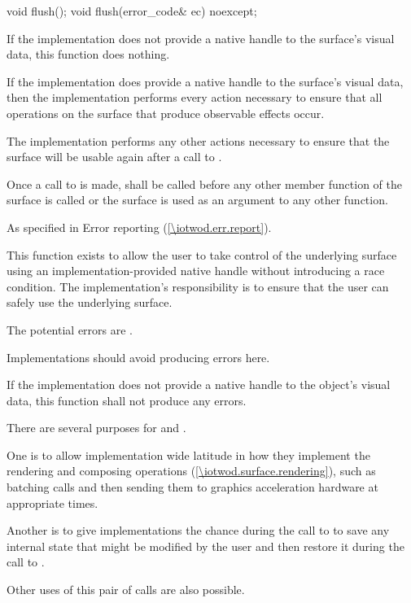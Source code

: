 %
\begin{itemdecl}
void flush();
void flush(error_code& ec) noexcept;
\end{itemdecl}
\begin{itemdescr}
\pnum
\effects
If the implementation does not provide a native handle to the surface's visual data, this function does nothing.

\pnum
If the implementation does provide a native handle to the surface's visual data, then the implementation performs every action necessary to ensure that all operations on the surface that produce observable effects occur.

\pnum
The implementation performs any other actions necessary to ensure that the surface will be usable again after a call to .

\pnum
Once a call to  is made,  shall be called before any other member function of the surface is called or the surface is used as an argument to any other function.

\pnum
\throws
As specified in Error reporting (\ref{\iotwod.err.report}).

\pnum
\remarks
This function exists to allow the user to take control of the underlying surface using an implementation-provided native handle without introducing a race condition. The implementation's responsibility is to ensure that the user can safely use the underlying surface.

\pnum
\errors
The potential errors are .

\pnum
Implementations should avoid producing errors here.

\pnum
If the implementation does not provide a native handle to the  object's visual data, this function shall not produce any errors.

\pnum
\begin{note}
There are several purposes for  and .

\pnum
One is to allow implementation wide latitude in how they implement the rendering and composing operations (\ref{\iotwod.surface.rendering}), such as batching calls and then sending them to graphics acceleration hardware at appropriate times.

\pnum
Another is to give implementations the chance during the call to  to save any internal state that might be modified by the user and then restore it during the call to .

\pnum
Other uses of this pair of calls are also possible.
\end{note}
\end{itemdescr}

